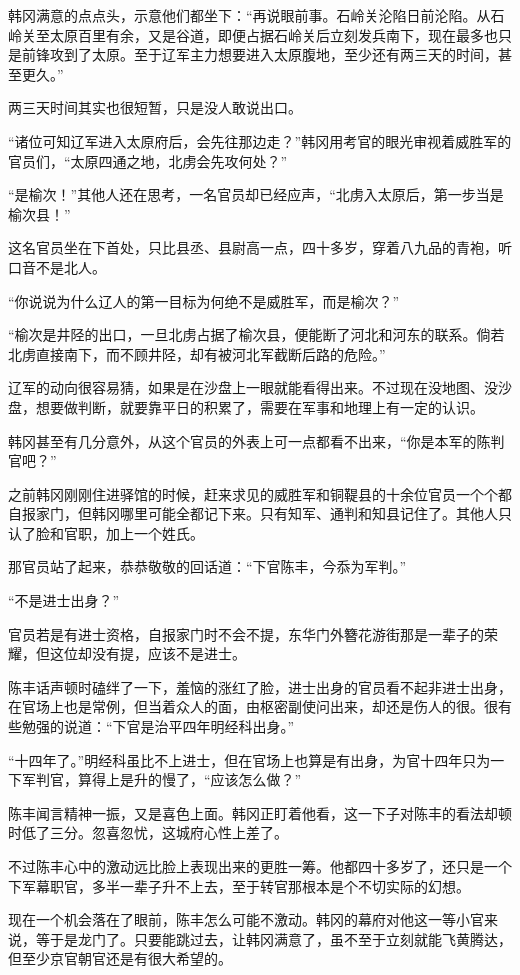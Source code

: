 韩冈满意的点点头，示意他们都坐下：“再说眼前事。石岭关沦陷日前沦陷。从石岭关至太原百里有余，又是谷道，即便占据石岭关后立刻发兵南下，现在最多也只是前锋攻到了太原。至于辽军主力想要进入太原腹地，至少还有两三天的时间，甚至更久。”

两三天时间其实也很短暂，只是没人敢说出口。

“诸位可知辽军进入太原府后，会先往那边走？”韩冈用考官的眼光审视着威胜军的官员们，“太原四通之地，北虏会先攻何处？”

“是榆次！”其他人还在思考，一名官员却已经应声，“北虏入太原后，第一步当是榆次县！”

这名官员坐在下首处，只比县丞、县尉高一点，四十多岁，穿着八九品的青袍，听口音不是北人。

“你说说为什么辽人的第一目标为何绝不是威胜军，而是榆次？”

“榆次是井陉的出口，一旦北虏占据了榆次县，便能断了河北和河东的联系。倘若北虏直接南下，而不顾井陉，却有被河北军截断后路的危险。”

辽军的动向很容易猜，如果是在沙盘上一眼就能看得出来。不过现在没地图、没沙盘，想要做判断，就要靠平日的积累了，需要在军事和地理上有一定的认识。

韩冈甚至有几分意外，从这个官员的外表上可一点都看不出来，“你是本军的陈判官吧？”

之前韩冈刚刚住进驿馆的时候，赶来求见的威胜军和铜鞮县的十余位官员一个个都自报家门，但韩冈哪里可能全都记下来。只有知军、通判和知县记住了。其他人只认了脸和官职，加上一个姓氏。

那官员站了起来，恭恭敬敬的回话道：“下官陈丰，今忝为军判。”

“不是进士出身？”

官员若是有进士资格，自报家门时不会不提，东华门外簪花游街那是一辈子的荣耀，但这位却没有提，应该不是进士。

陈丰话声顿时磕绊了一下，羞恼的涨红了脸，进士出身的官员看不起非进士出身，在官场上也是常例，但当着众人的面，由枢密副使问出来，却还是伤人的很。很有些勉强的说道：“下官是治平四年明经科出身。”

“十四年了。”明经科虽比不上进士，但在官场上也算是有出身，为官十四年只为一下军判官，算得上是升的慢了，“应该怎么做？”

陈丰闻言精神一振，又是喜色上面。韩冈正盯着他看，这一下子对陈丰的看法却顿时低了三分。忽喜忽忧，这城府心性上差了。

不过陈丰心中的激动远比脸上表现出来的更胜一筹。他都四十多岁了，还只是一个下军幕职官，多半一辈子升不上去，至于转官那根本是个不切实际的幻想。

现在一个机会落在了眼前，陈丰怎么可能不激动。韩冈的幕府对他这一等小官来说，等于是龙门了。只要能跳过去，让韩冈满意了，虽不至于立刻就能飞黄腾达，但至少京官朝官还是有很大希望的。

